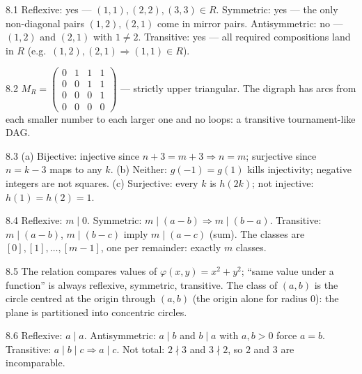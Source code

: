 \begin{solution}{8.1}
Reflexive: yes --- $(1,1),(2,2),(3,3) \in R$. Symmetric: yes --- the only
non-diagonal pairs $(1,2),(2,1)$ come in mirror pairs. Antisymmetric: no ---
$(1,2)$ and $(2,1)$ with $1 \neq 2$. Transitive: yes --- all required
compositions land in $R$ (e.g.\ $(1,2),(2,1) \Rightarrow (1,1)\in R$).
\end{solution}

\begin{solution}{8.2}
$M_R = \begin{pmatrix}0&1&1&1\\0&0&1&1\\0&0&0&1\\0&0&0&0\end{pmatrix}$ ---
strictly upper triangular. The digraph has arcs from each smaller number to
each larger one and no loops: a transitive tournament-like DAG.
\end{solution}

\begin{solution}{8.3}
(a) Bijective: injective since $n+3 = m+3 \Rightarrow n = m$; surjective
since $n = k - 3$ maps to any $k$. (b) Neither: $g(-1) = g(1)$ kills
injectivity; negative integers are not squares. (c) Surjective: every $k$
is $h(2k)$; not injective: $h(1) = h(2) = 1$.
\end{solution}

\begin{solution}{8.4}
Reflexive: $m \mid 0$. Symmetric: $m \mid (a - b) \Rightarrow m \mid (b-a)$.
Transitive: $m \mid (a-b)$, $m \mid (b-c)$ imply $m \mid (a-c)$ (sum). The
classes are $[0], [1], \ldots, [m-1]$, one per remainder: exactly $m$
classes.
\end{solution}

\begin{solution}{8.5}
The relation compares values of $\varphi(x,y) = x^2 + y^2$; ``same value
under a function'' is always reflexive, symmetric, transitive. The class of
$(a,b)$ is the circle centred at the origin through $(a,b)$ (the origin
alone for radius $0$): the plane is partitioned into concentric circles.
\end{solution}

\begin{solution}{8.6}
Reflexive: $a \mid a$. Antisymmetric: $a \mid b$ and $b \mid a$ with
$a,b > 0$ force $a = b$. Transitive: $a \mid b \mid c \Rightarrow a \mid c$.
Not total: $2 \nmid 3$ and $3 \nmid 2$, so $2$ and $3$ are incomparable.
\end{solution}

